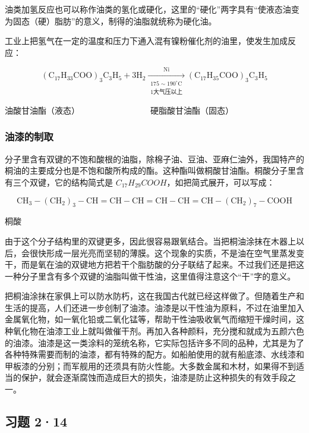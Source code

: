 油类加氢反应也可以称作油类的氢化或硬化，这里的``硬化''两字具有``使液态油变为固态（硬）脂肪''的意义，制得的油脂就统称为硬化油。

工业上把氢气在一定的温度和压力下通入混有镍粉催化剂的油里，使发生加成反应：

\[
(\mathrm{C}_{17}\mathrm{H}_{33}\mathrm{COO})_{3}\mathrm{C}_{3}\mathrm{H}_{5}+3\mathrm{H}_{2}
\xrightarrow[\substack{175\sim190^\circ\mathrm{C}\\1\text{大气压以上}}]{\mathrm{Ni}}
(\mathrm{C}_{17}\mathrm{H}_{35}\mathrm{COO})_{3}\mathrm{C}_{3}\mathrm{H}_{5}
\]

油酸甘油酯（液态）　　　　　　　　　硬脂酸甘油酯（固态）

\subsubsection{油漆的制取}

分子里含有双键的不饱和酸根的油脂，除棉子油、豆油、亚麻仁油外，我国特产的桐油的主要成分也是不饱和酸所构成的酯。这种酯叫做桐酸甘油酯。桐酸分子里含有三个双键，它的结构简式是
\(C_{17}H_{29}COOH\)，如把简式展开，可以写成：

\[
\mathrm{CH} _ {3} - (\mathrm{CH} _ {2}) _ {3} - \mathrm{CH} = \mathrm{CH} - \mathrm{CH} = \mathrm{CH} - \mathrm{CH} = \mathrm{CH} - (\mathrm{CH} _ {2}) _ {7} - \mathrm{COOH}
\]

桐酸

由于这个分子结构里的双键更多，因此很容易跟氧结合。当把桐油涂抹在木器上以后，会很快形成一层光亮而坚韧的薄膜。这个现象的实质，不是油在空气里蒸发变干，而是氧在油的双键地方把若干个脂肪酸的分子联结了起来。不过我们还是把这一种分子里含有多个双键的油脂叫做干性油，这里值得注意这个``干''字的意义。

把桐油涂抹在家俱上可以防水防朽，这在我国古代就已经这样做了。但随着生产和生活的提高，人们还进一步创制了油漆。油漆是以干性油为原料，不过在油里加入金属氧化物，如一氧化铅或二氧化锰等，帮助干性油吸收氧气而缩短干燥时间，这种氧化物在油漆工业上就叫做催干剂。再加入各种颜料，充分搅和就成为五颜六色的油漆。油漆是这一类涂料的笼统名称，它实际包括许多不同的品种，尤其是为了各种特殊需要而制的油漆，都有特殊的配方。如船舶使用的就有船底漆、水线漆和甲板漆的分别；而军舰用的还须具有防火性能。大多数金属和木材，如果得不到适当的保护，就会逐渐腐蚀而造成巨大的损失，油漆是防止这种损失的有效手段之一。

\subsection{习题 2·14}

